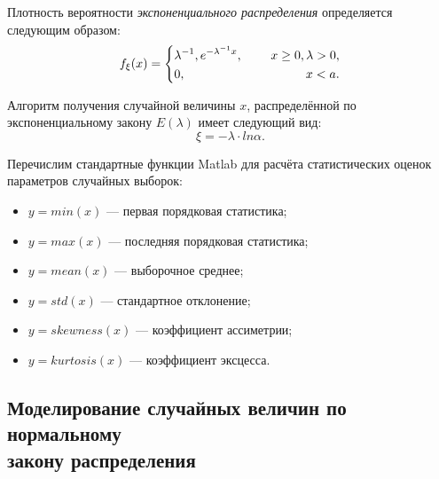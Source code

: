 Плотность вероятности \textit{экспоненциального распределения} определяется следующим образом:
\begin{equation}
  \begin{aligned}
    f_{\xi}(x) =
    \left\{
      \begin{aligned}
        &\lambda^{-1}, e^{-\lambda^{-1}x}, \hspace{5mm} &x \ge 0, \lambda > 0, \\
        &0, \hspace{11.5mm} &x < a.
      \end{aligned}
    \right.
  \end{aligned}
\end{equation}

Алгоритм получения случайной величины $ x $, распределённой по экспоненциальному
закону $ E (\lambda) $ имеет следующий вид:
$$
  \xi = -\lambda \cdot ln \alpha.
$$

Перечислим стандартные функции Matlab для расчёта статистических оценок
параметров случайных выборок:

\begin{itemize}
  \item $ y = min (x) $ --- первая порядковая статистика;
  \item $ y = max(x) $ --- последняя порядковая статистика;
  \item $ y = mean (x) $ --- выборочное среднее;
  \item $ y = std (x) $ --- стандартное отклонение;
  \item $ y = skewness (x) $ --- коэффициент ассиметрии;
  \item $ y = kurtosis (x) $ --- коэффициент эксцесса.
\end{itemize}

\newpage

\subsection{Моделирование случайных величин по нормальному \\ закону распределения}

